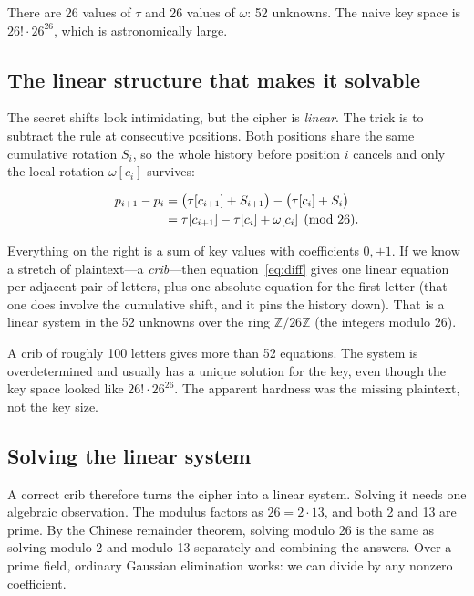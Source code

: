 \documentclass[11pt]{article}
\begin{document}
There are 26 values of $\tau$ and 26 values of $\omega$: 52 unknowns.  The
naive key space is $26!\cdot 26^{26}$, which is astronomically large.

\subsection{The linear structure that makes it solvable}\label{sec:linear}

The secret shifts look intimidating, but the cipher is \emph{linear}.  The
trick is to subtract the rule at consecutive positions.  Both positions share
the same cumulative rotation $S_i$, so the whole history before position $i$
cancels and only the local rotation $\omega[c_i]$ survives:

\begin{align}
p_{i+1}-p_i
&= \bigl(\tau[c_{i+1}]+S_{i+1}\bigr) - \bigl(\tau[c_i]+S_i\bigr)\notag\\
&= \tau[c_{i+1}] - \tau[c_i] + \omega[c_i] \pmod{26}.
\label{eq:diff}
\end{align}

Everything on the right is a sum of key values with coefficients $0,\pm1$.
If we know a stretch of plaintext---a \emph{crib}---then
equation~\eqref{eq:diff} gives one linear equation per adjacent pair of
letters, plus one absolute equation for the first letter (that one does
involve the cumulative shift, and it pins the history down).  That is a
linear system in the 52 unknowns over the ring $\mathbb{Z}/26\mathbb{Z}$ (the
integers modulo 26).

\begin{keyidea}
A crib of roughly 100 letters gives more than 52 equations.  The system is
overdetermined and usually has a unique solution for the key, even though the
key space looked like $26!\cdot 26^{26}$.  The apparent hardness was the
missing plaintext, not the key size.
\end{keyidea}

\subsection{Solving the linear system}

A correct crib therefore turns the cipher into a linear system.  Solving it
needs one algebraic observation.  The modulus factors as $26 = 2\cdot 13$, and
both 2 and 13 are prime.  By the Chinese remainder theorem, solving modulo 26
is the same as solving modulo 2 and modulo 13 separately and combining the
answers.  Over a prime field, ordinary Gaussian elimination works: we can
divide by any nonzero coefficient.
\end{document}
